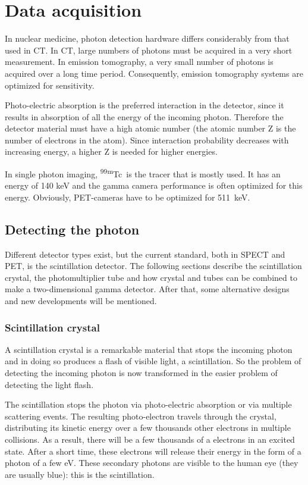 \chapter{Data acquisition}

In nuclear medicine, photon detection hardware differs considerably from that
used in CT. In CT, large numbers of photons must be acquired in a very short
measurement. In emission tomography, a very small number of photons is
acquired over a long time period. Consequently, emission tomography systems are
optimized for sensitivity.

Photo-electric absorption is the preferred interaction in the detector, since
it results in absorption of all the energy of the incoming photon. Therefore
the detector material must have a high atomic number (the atomic number Z is
the number of electrons in the atom). Since interaction probability decreases
with increasing energy, a higher Z is needed for higher energies.

In single photon imaging, \textsuperscript{99m}Tc\ is the tracer that is mostly used. It has
an energy of 140 keV and the gamma camera performance is often optimized for
this energy.  Obviously, PET-cameras have to be optimized for 511~keV.

\section{Detecting the photon}
Different detector types exist, but the current standard, both in SPECT and
PET, is the scintillation detector. The following sections describe the
scintillation crystal, the photomultiplier tube and how crystal and tubes
can be combined to make a two-dimensional gamma detector. After that, some
alternative designs and new developments will be mentioned.

\subsection{Scintillation crystal}
A scintillation crystal is a remarkable material that stops the incoming
photon and in doing so produces a flash of visible light, a scintillation.
So the problem of detecting the incoming photon is now transformed in the
easier problem of detecting the light flash.

The scintillation stops the photon via photo-electric absorption or via
multiple scattering events. The resulting photo-electron travels through the
crystal, distributing its kinetic energy over a few thousands other electrons
in multiple collisions. As a result, there will be a few thousands of a
electrons in an excited state. After a short time, these electrons will
release their energy in the form of a photon of a few eV. These secondary
photons are visible to the human eye (they are usually blue): this is the
scintillation.

